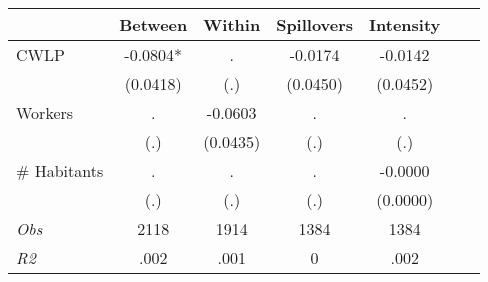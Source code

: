 \begin{tabular}{l*{6}{c}}\hline&\multicolumn{1}{c}{Between}&\multicolumn{1}{c}{Within}&\multicolumn{1}{c}{Spillovers}&\multicolumn{1}{c}{Intensity}\\ \hline 
CWLP & -0.0804* & . & -0.0174 & -0.0142 \\
 & (0.0418) & (.) & (0.0450) & (0.0452) \\
Workers & . & -0.0603 & . & . \\
 & (.) & (0.0435) & (.) & (.) \\
\# Habitants & . & . & . & -0.0000 \\
  & (.) & (.) & (.) & (0.0000) \\
\hline \textit{Obs} & 2118 & 1914 & 1384 & 1384  \\ \textit{R2} & .002 & .001 & 0 & .002 \\ \hline \end{tabular}
